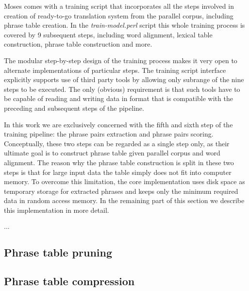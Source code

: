 
Moses comes with a training script that incorporates all the steps involved in
creation of ready-to-go translation system from the parallel corpus,
including phrase table creation.
In the \emph{train-model.perl} script this whole training process is covered by
9 subsequent steps,
including word alignment, lexical table construction, phrase table construction and more.

The modular step-by-step design of the training process makes it very open to
alternate implementations of particular steps.
The training script interface explicitly supports use of third party tools by
allowing only subrange of the nine steps to be executed.
The only (obvious) requirement is that such tools have to be capable of reading and
writing data in format that is compatible with the preceding and subsequent steps
of the pipeline.

In this work we are exclusively concerned with the fifth and sixth step of
the training pipeline: the phrase pairs extraction and phrase pairs scoring.
Conceptually, these two steps can be regarded as a single step only, as their ultimate
goal is to construct phrase table given parallel corpus and word alignment.
The reason why the phrase table construction is split in these two steps is that
for large input data the table simply does not fit into computer memory.
To overcome this limitation, the core implementation uses disk space as temporary storage
for extracted phrases and keeps only the minimum required data in random access memory.
In the remaining part of this section we describe this implementation in more detail.

...

\subsection{Phrase table pruning}


\subsection{Phrase table compression}

